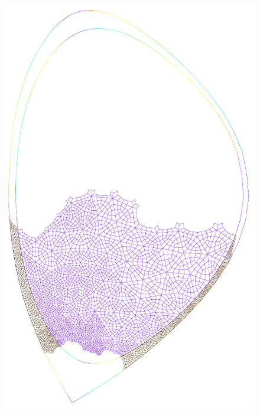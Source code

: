 \begin{figure}
{\includegraphics[scale=.5]{images/tokamak_layer_mesh_adapt_fine_2_ref.pdf}}\quad
\subfigure[{rank = 3}\label{fig:tokamak_layer_mesh_adapt_fine_3_ref}]

\end{figure}
